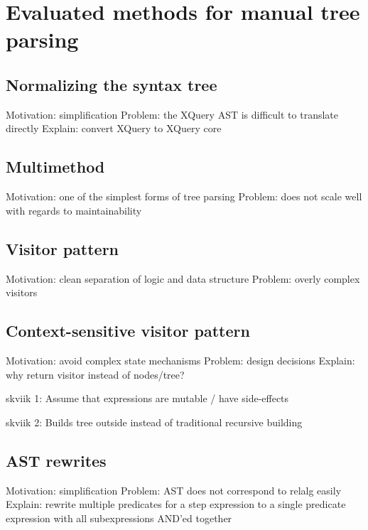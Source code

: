 \section{Evaluated methods for manual tree parsing}
\label{sect:method:evaluated_methods}

\subsection{Normalizing the syntax tree}
Motivation: simplification
Problem: the XQuery AST is difficult to translate directly
Explain: convert XQuery to XQuery core

\subsection{Multimethod}
\label{sect:method:evaluated_methods}
Motivation: one of the simplest forms of tree parsing
Problem: does not scale well with regards to maintainability

\subsection{Visitor pattern}
\label{sect:method:evaluated_methods}
Motivation: clean separation of logic and data structure 
Problem: overly complex visitors

\subsection{Context-sensitive visitor pattern}
\label{sect:method:evaluated_methods}
Motivation: avoid complex state mechanisms
Problem: design decisions
Explain: why return visitor instead of nodes/tree?

skviik 1: Assume that expressions are mutable / have side-effects

skviik 2: Builds tree outside instead of traditional recursive building

\subsection{AST rewrites}
Motivation: simplification
Problem: AST does not correspond to relalg easily
Explain: rewrite multiple predicates for a step expression to a single 
         predicate expression with all subexpressions AND'ed together
         

